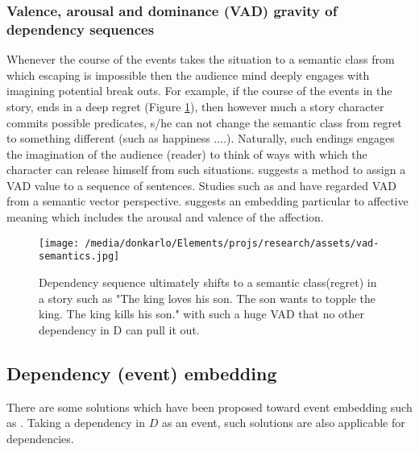 \documentclass{article}
\begin{document}
	\subsubsection{Valence, arousal and dominance (VAD) gravity of dependency sequences}
	Whenever the course of the events takes the situation to a semantic class from which escaping is impossible then the audience mind deeply engages with imagining potential break outs. For example, if the course of the events in the story, ends in a deep regret (Figure \ref{fig:vad}), then however much a story character commits possible predicates, s/he can not change the semantic class from regret to something different (such as happiness ....). Naturally, such endings engages the imagination of the audience (reader) to think of ways with which the character can release himself from such situations. \citet{buechel-2016-feelings-from-the-past-adapting-affective-lexicons-for-historical-emotion-analysis} suggests a method to assign a VAD value to a sequence of sentences. Studies such as \citet{agrawal-2018-learning-emotion-enriched-word-representations,mao-2019-sentiment-aware-word-embedding-for-emotion-classification} and 
	\citet{li-2017-inferring-affective-meanings-of-words-from-word-embedding} have regarded VAD from a semantic vector perspective. \citet{li-2017-inferring-affective-meanings-of-words-from-word-embedding} suggests an embedding particular to affective meaning which includes the arousal and valence of the affection.
	\begin{figure}[h!]
		\centering
		\texttt{[image: /media/donkarlo/Elements/projs/research/assets/vad-semantics.jpg]}
		\caption{Dependency sequence ultimately shifts to a semantic class(regret) in a story such as "The king loves his son. The son wants to topple the king. The king kills his son." with such a huge VAD that no other dependency in D can pull it out.} 
		\label{fig:vad}
	\end{figure}
	
	
	\subsection{Dependency (event) embedding} \label{sec:related-works-dependeny-embedding}
	There are some solutions which have been proposed toward event embedding such as
	\citet{weber-2018-event-representations-with-tensor-based-compositions}. Taking a dependency in $D$ as an event, such solutions are also applicable for dependencies. 
	
\end{document}
